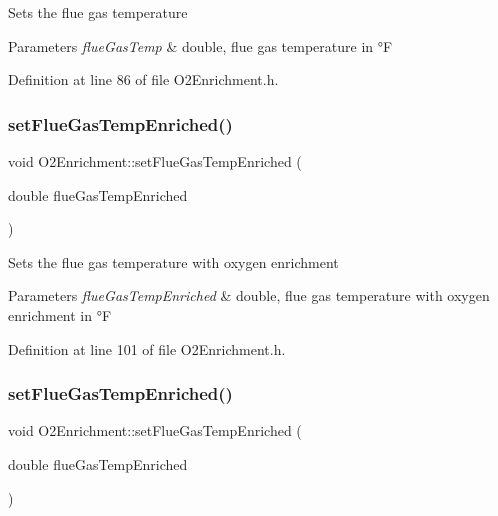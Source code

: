 Sets the flue gas temperature 
\begin{DoxyParams}{Parameters}
{\em flue\+Gas\+Temp} & double, flue gas temperature in °F \\
\hline
\end{DoxyParams}


Definition at line 86 of file O2\+Enrichment.\+h.

\mbox{\label{class_o2_enrichment_a787af9e47a73f2416d6c5d23aaf6d659}} 
\subsubsection{\texorpdfstring{set\+Flue\+Gas\+Temp\+Enriched()}{setFlueGasTempEnriched()}\hspace{0.1cm}{\footnotesize\ttfamily [1/3]}}
{\footnotesize\ttfamily void O2\+Enrichment\+::set\+Flue\+Gas\+Temp\+Enriched (\begin{DoxyParamCaption}\item[{double}]{flue\+Gas\+Temp\+Enriched }\end{DoxyParamCaption})\hspace{0.3cm}{\ttfamily [inline]}}

Sets the flue gas temperature with oxygen enrichment 
\begin{DoxyParams}{Parameters}
{\em flue\+Gas\+Temp\+Enriched} & double, flue gas temperature with oxygen enrichment in °F \\
\hline
\end{DoxyParams}


Definition at line 101 of file O2\+Enrichment.\+h.

\mbox{\label{class_o2_enrichment_a787af9e47a73f2416d6c5d23aaf6d659}} 
\subsubsection{\texorpdfstring{set\+Flue\+Gas\+Temp\+Enriched()}{setFlueGasTempEnriched()}\hspace{0.1cm}{\footnotesize\ttfamily [2/3]}}
{\footnotesize\ttfamily void O2\+Enrichment\+::set\+Flue\+Gas\+Temp\+Enriched (\begin{DoxyParamCaption}\item[{double}]{flue\+Gas\+Temp\+Enriched }\end{DoxyParamCaption})\hspace{0.3cm}{\ttfamily [inline]}}

